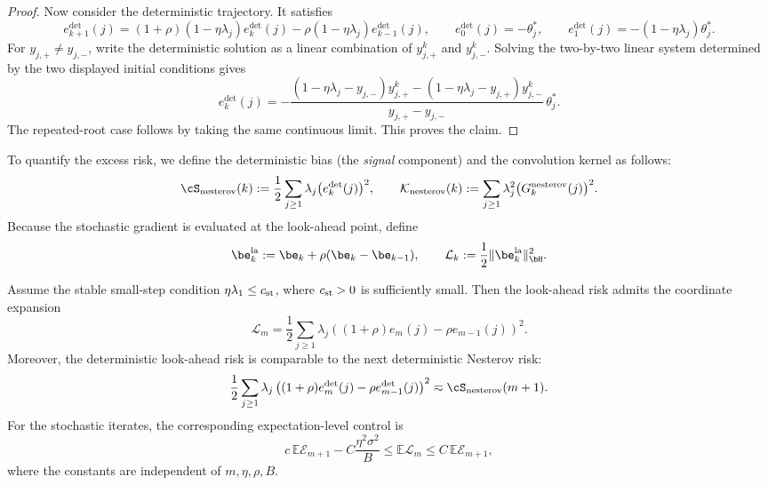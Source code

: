 \documentclass[11pt]{article}
\newcommand{\nesterov}{\mathrm{nesterov}}
\newcommand{\la}{\mathrm{la}}
\begin{document}
\begin{proof}
Now consider the deterministic trajectory. It satisfies
\[
    e_{k+1}^{\mathrm{det}}(j)
    =
    (1+\rho)(1-\eta\lambda_j)e_k^{\mathrm{det}}(j)
    -\rho(1-\eta\lambda_j)e_{k-1}^{\mathrm{det}}(j),
    \qquad
    e_0^{\mathrm{det}}(j)=-\theta_j^*,
    \qquad
    e_1^{\mathrm{det}}(j)=-(1-\eta\lambda_j)\theta_j^*.
\]
For $y_{j,+}\neq y_{j,-}$, write the deterministic solution as a linear combination of $y_{j,+}^k$ and
$y_{j,-}^k$. Solving the two-by-two linear system determined by the two displayed initial conditions gives
\[
    e_k^{\mathrm{det}}(j)
    =
    -\frac{(1-\eta\lambda_j-y_{j,-})y_{j,+}^{k}
    -(1-\eta\lambda_j-y_{j,+})y_{j,-}^{k}}
    {y_{j,+}-y_{j,-}}\,\theta_j^* .
\]
The repeated-root case follows by taking the same continuous limit. This proves the claim.
\end{proof}

To quantify the excess risk, we define the deterministic bias (the \textit{signal} component) and the convolution kernel as follows:
\[
    \cS_{\nesterov}(k)
    :=
    \frac12\sum_{j\ge1}\lambda_j\bigl(e_k^{\mathrm{det}}(j)\bigr)^2,
    \qquad
    \mathcal K_{\nesterov}(k)
    :=
    \sum_{j\ge1}\lambda_j^2\bigl(G_k^{\nesterov}(j)\bigr)^2.
\]
Because the stochastic gradient is evaluated at the look-ahead point, define
\[
    \be_k^{\la}:=\be_k+\rho(\be_k-\be_{k-1}),
    \qquad
    \mathcal L_k:=\frac12\|\be_k^{\la}\|_{\bH}^2.
\]

\begin{lemma}
\label{lem:nes_lookahead_loss_control}
Assume the stable small-step condition \(\eta\lambda_1\le c_{\rm st}\), where \(c_{\rm st}>0\) is sufficiently small.  Then the look-ahead risk admits the coordinate expansion
\[
    \mathcal L_m
    =
    \frac12\sum_{j\ge1}\lambda_j
    \left((1+\rho)e_m(j)-\rho e_{m-1}(j)\right)^2.
\]
Moreover, the deterministic look-ahead risk is comparable to the next deterministic Nesterov risk:
\[
    \frac12\sum_{j\ge1}\lambda_j
    \left((1+\rho)e_m^{\mathrm{det}}(j)-\rho e_{m-1}^{\mathrm{det}}(j)\right)^2
    \eqsim
    \cS_{\nesterov}(m+1).
\]
For the stochastic iterates, the corresponding expectation-level control is
\[
    c\,\mathbb{E}\mathcal E_{m+1}-C\frac{\eta^2\sigma^2}{B}
    \le
    \mathbb{E}\mathcal L_m
    \le
    C\,\mathbb{E}\mathcal E_{m+1},
\]
where the constants are independent of \(m,\eta,\rho,B\).
\end{lemma}
\end{document}
